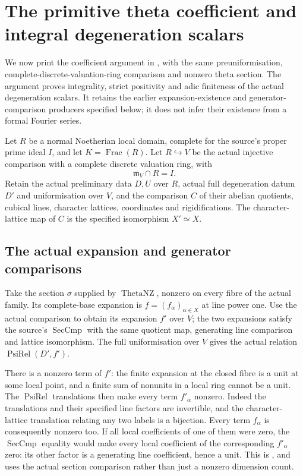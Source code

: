 \section{The primitive theta coefficient and integral degeneration scalars}
\label{sec:faithful-psi-normalisation}
We now print the coefficient argument in
, with the same
preuniformisation, complete-discrete-valuation-ring comparison and
nonzero theta section. The argument proves integrality, strict
positivity and adic finiteness of the actual degeneration scalars.
It retains the earlier expansion-existence and generator-comparison
producers specified below; it does not infer their existence from a
formal Fourier series.

Let \(R\) be a normal Noetherian local domain, complete for the
source's proper prime ideal \(I\), and let \(K=\operatorname{Frac}(R)\).
Let \(R\hookrightarrow V\) be the actual injective comparison with a
complete discrete valuation ring, with
\[
                        \mathfrak m_V\cap R=I.
 \tag{PN1}\label{eq:psi-normalisation-centre}
\]
Retain the actual preliminary data \(D,U\) over \(R\), actual full
degeneration datum \(D'\) and uniformisation over \(V\), and the
comparison \(C\) of their abelian quotients, cubical lines, character
lattices, coordinates and rigidifications.
The character-lattice map of \(C\) is the specified isomorphism
\(X'\simeq X\).

\subsection{The actual expansion and generator comparisons}
Take the section \(\sigma\) supplied by
\(\operatorname{ThetaNZ}\), nonzero on every fibre of the actual
family. Its complete-base expansion is \(f=(f_\alpha)_{\alpha\in X}\)
at line power one.
Use the actual comparison to obtain its expansion \(f'\) over
\(V\); the two expansions satisfy the source's
\(\operatorname{SecCmp}\) with the same quotient map, generating
line comparison and lattice isomorphism.
The full uniformisation over \(V\) gives the actual relation
\(\operatorname{PsiRel}(D',f')\).

There is a nonzero term of \(f'\): the finite expansion at the
closed fibre is a unit at some local point, and a finite sum of
nonunits in a local ring cannot be a unit.
The \(\operatorname{PsiRel}\) translations then make every
term \(f'_\alpha\) nonzero. Indeed the translations and their
specified line factors are invertible, and the character-lattice
translation relating any two labels is a bijection.
Every term \(f_\alpha\) is consequently nonzero too.
If all local coefficients of one of them were zero, the
\(\operatorname{SecCmp}\) equality would make every local
coefficient of the corresponding \(f'_\alpha\) zero: its other
factor is a generating line coefficient, hence a unit.
This is , and uses the actual
section comparison rather than just a nonzero dimension count.

